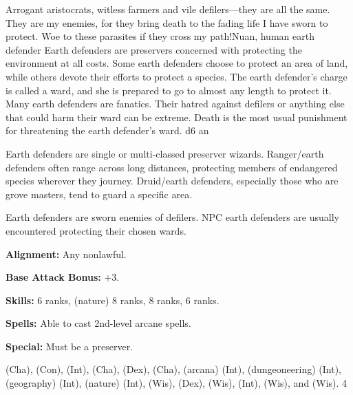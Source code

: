 
{Arrogant aristocrats, witless farmers and vile defilers---they are all the same. They are my enemies, for they bring death to the fading life I have sworn to protect. Woe to these parasites if they cross my path!}{Nuan, human earth defender}
{Earth defenders are preservers concerned with protecting the environment at all costs. Some earth defenders choose to protect an area of land, while others devote their efforts to protect a species. The earth defender's charge is called a ward, and she is prepared to go to almost any length to protect it. Many earth defenders are fanatics. Their hatred against defilers or anything else that could harm their ward can be extreme. Death is the most usual punishment for threatening the earth defender's ward.}
{d6}
{an}
{
Earth defenders are single or multi-classed preserver wizards. Ranger/earth defenders often range across long distances, protecting members of endangered species wherever they journey. Druid/earth defenders, especially those who are grove masters, tend to guard a specific area.

Earth defenders are sworn enemies of defilers. NPC earth defenders are usually encountered protecting their chosen wards.
}
{
\textbf{Alignment:} Any nonlawful.

\textbf{Base Attack Bonus:} +3.

\textbf{Skills:}  6 ranks,  (nature) 8 ranks,  8 ranks,  6 ranks.

\textbf{Spells:} Able to cast 2nd-level arcane spells.

\textbf{Special:} Must be a preserver.
}
{ (Cha),  (Con),  (Int),  (Cha),  (Dex),  (Cha),  (arcana) (Int),  (dungeoneering) (Int),  (geography) (Int),  (nature) (Int),  (Wis),  (Dex),  (Wis),  (Int),  (Wis), and  (Wis).}
{4}
{}{}
